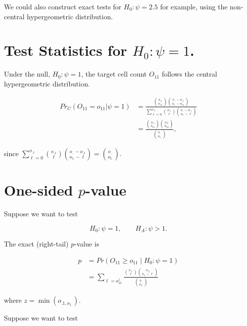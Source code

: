\documentclass[
  letterpaper,
  DIV=11,
  numbers=noendperiod]{scrreport}
\begin{document}
We could also construct exact tests for \(H_0: \psi = 2.5\) for example,
using the non-central hypergeometric distribution.

\hypertarget{test-statistics-for-h_0-psi-1.}{%
\section{\texorpdfstring{Test Statistics for
\(H_0 : \psi = 1\).}{Test Statistics for H\_0 : \textbackslash psi = 1.}}\label{test-statistics-for-h_0-psi-1.}}

Under the null, \(H_0 : \psi = 1\), the target cell count \(O_{11}\)
follows the central hypergeometric distribution.

\[
\begin{aligned}
Pr_C(O_{11} = o_{11} | \psi = 1) & = 
\frac{\displaystyle
  {o_{.1} \choose o_{11}} {o_{..} - o_{.1} \choose {o_{1.} - o_{11}}}
  }{\displaystyle
    \sum_{\ell=0}^{o_{.1}} { o_{.1} \choose \ell} { o_{..} - o_{.1} \choose o_{1.} - \ell }
  } \\ 
& = \frac{\displaystyle
  {o_{.1} \choose o_{11}} {o_{.2} \choose o_{12}}
  }{\displaystyle
    { o_{..} \choose o_{1.}}
  },
\end{aligned}
  \]

since
\(\displaystyle \sum_{\ell = 0}^{o_{.1}} { o_{.1} \choose \ell} { o_{..} - o_{.1} \choose o_{1.} - \ell } = { o_{..} \choose o_{1.}}\).

\hypertarget{one-sided-p-value-1}{%
\section{\texorpdfstring{One-sided
\(p\)-value}{One-sided p-value}}\label{one-sided-p-value-1}}

Suppose we want to test

\[H_0 : \psi = 1, \quad \quad H_A : \psi > 1. \]

The exact (right-tail) \(p\)-value is

\[\begin{aligned}
p & = Pr(O_{11} \geq o_{11} \mid H_0 \colon \psi = 1)\\
& = \sum_{\ell = o_{11}^z } \frac{\displaystyle
  {o_{.1} \choose \ell } {o_{.2} \choose o_{1.} - \ell }
  }{\displaystyle
    { o_{..} \choose o_{1.}}
  }
\end{aligned}
\]

where \(z = \min (o_{.1, o_{1.}})\).

Suppose we want to test
\end{document}
